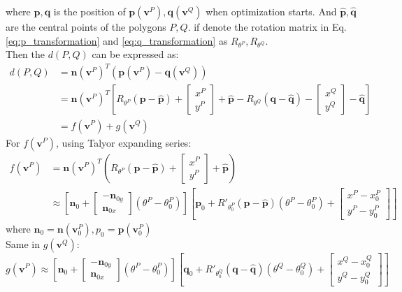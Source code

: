 \documentclass[12pt]{article}
\newcommand{\bt}{\mathbf{t}}
\newcommand{\bn}{\mathbf{n}}
\newcommand{\bq}{\mathbf{q}}
\newcommand{\bp}{\mathbf{p}}
\newcommand{\tq}{\mathbf{\hat{q}}}
\newcommand{\tp}{\mathbf{\hat{p}}}
\newcommand{\barq}{\mathbf{\bar{q}}}
\newcommand{\barp}{\mathbf{\bar{p}}}
\newcommand{\bv}{\mathbf{v}}
\begin{document}
where $\bp, \bq$ is the position of $\bp(\bv^P), \bq(\bv^Q)$ when optimization starts. And $\tp, \tq$ are the central points of the polygons $P, Q$. if denote the rotation matrix in Eq.\ref{eq:p_transformation} and \ref{eq:q_transformation} as $R_{\theta^P}, R_{\theta^Q}$. \\
Then the $d(P,Q)$ can be expressed as:
\begin{align}
	d(P,Q)& =  \bn(\bv^P)^T(\bp(\bv^P) - \bq(\bv^Q))\\
			   &= \bn(\bv^P)^T[R_{\theta^P}(\bp -\tp)+\begin{bmatrix}
	x^P\\
	y^P
	\end{bmatrix} +\tp - R_{\theta^Q}(\bq -\tq) - \begin{bmatrix}
	x^Q\\
	y^Q
	\end{bmatrix} - \tq]\\
			&= f(\bv^P) + g(\bv^Q)
\end{align}
For $f(\bv^P)$, using Talyor expanding series:
\begin{align}
	f(\bv^P) &= \bn(\bv^P)^T(R_{\theta^P}(\bp -\tp)+\begin{bmatrix}
	x^P\\
	y^P
	\end{bmatrix} +\tp) \\
	&\approx [\bn_0 + \begin{bmatrix}
		-\bn_{0y}\\
		\bn_{0x}
	\end{bmatrix}(\theta^P - \theta^P_0)][\bp_0 + R'_{\theta^P_0}(\bp - \tp)(\theta^P - \theta^P_0) + \begin{bmatrix}
	x^P - x^P_0\\
	y^P - y^P_0
	\end{bmatrix}]
\end{align}
where $\bn_0 = \bn(\bv^P_0), p_0 = \bp(\bv^P_0)$ \\
Same in $g(\bv^Q)$:
\begin{equation}
	g(\bv^P) \approx [\bn_0 + \begin{bmatrix}
		-\bn_{0y}\\
		\bn_{0x}
	\end{bmatrix}(\theta^P - \theta^P_0)][\bq_0 + R'_{\theta^Q_0}(\bq - \tq)(\theta^Q - \theta^Q_0) + \begin{bmatrix}
	x^Q - x^Q_0\\
	y^Q - y^Q_0
	\end{bmatrix}]
\end{equation}
\end{document}
